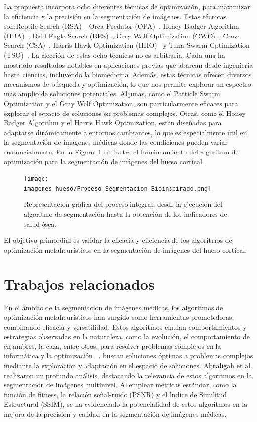 \documentclass[conference]{IEEEtran}
\begin{document}
\noindent La propuesta incorpora ocho diferentes técnicas de optimización, para maximizar la eficiencia y la precisión en la segmentación de imágenes. Estas técnicas son:Reptile Search (RSA)~\cite{Abualigah2022}, Orca Predator (OPA)~\cite{Jiang2022}, Honey Badger Algorithm (HBA)~\cite{Hashim2022}, Bald Eagle Search (BES)~\cite{Alsattar2019}, Gray Wolf Optimization (GWO)~\cite{Mirjalili2014}, Crow Search (CSA)~\cite{Askarzadeh2016}, Harris Hawk Optimization (HHO)~\cite{Heidari2019}  y Tuna Swarm Optimization (TSO)~\cite{Xie2021}. La elección de estas ocho técnicas no es arbitraria. Cada una ha mostrado resultados notables en aplicaciones previas que abarcan desde ingeniería hasta ciencias, incluyendo la biomedicina. Además, estas técnicas ofrecen diversos mecanismos de búsqueda y optimización, lo que nos permite explorar un espectro más amplio de soluciones potenciales. Algunas, como el Particle Swarm Optimization y el Gray Wolf Optimization, son particularmente eficaces para explorar el espacio de soluciones en problemas complejos. Otras, como el Honey Badger Algorithm y el Harris Hawk Optimization, están diseñadas para adaptarse dinámicamente a entornos cambiantes, lo que es especialmente útil en la segmentación de imágenes médicas donde las condiciones pueden variar sustancialmente. En la Figura~\ref{fig:z} se ilustra el funcionamiento del algoritmo de optimización para la segmentación de imágenes del hueso cortical.

\begin{figure}[ht]
    \centering
    \texttt{[image: imagenes\_hueso/Proceso\_Segmentacion\_Bioinspirado.png]}
    \caption{Representación gráfica del proceso integral, desde la ejecución del algoritmo de segmentación hasta la obtención de los indicadores de salud ósea.}
    \label{fig:z}
\end{figure}

El objetivo primordial es validar la eficacia y eficiencia de los algoritmos de optimización metaheurísticos en la segmentación de imágenes del hueso cortical.
\section{Trabajos relacionados} \label{sec:rw}

\noindent En el ámbito de la segmentación de imágenes médicas, los algoritmos de optimización metaheurísticos han surgido como herramientas prometedoras, combinando eficacia y versatilidad. Estos algoritmos emulan comportamientos y estrategias observadas en la naturaleza, como la evolución, el comportamiento de enjambres, la caza, entre otros, para resolver problemas complejos en la informática y la optimización ~\cite{Darwish2018}. buscan soluciones óptimas a problemas complejos mediante la exploración y adaptación en el espacio de soluciones. Abualigah et al.\cite{Abualigah2023} realizaron un profundo análisis, destacando la relevancia de estos algoritmos en la segmentación de imágenes multinivel. Al emplear métricas estándar, como la función de fitness, la relación señal-ruido (PSNR) y el Índice de Similitud Estructural (SSIM), se ha evidenciado la potencialidad de estos algoritmos en la mejora de la precisión y calidad en la segmentación de imágenes médicas\cite{Ma2023}.
\end{document}
